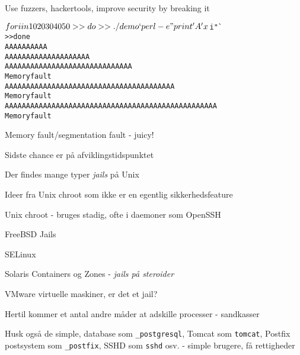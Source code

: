 \documentclass[Screen16to9,17pt]{foils}
\begin{document}



\centerline{Use fuzzers, hackertools, improve security by breaking it}



\begin{alltt}
$ for i in 10 20 30 40 50
>> do
>> ./demo `perl -e "print 'A'x$i"`
>> done
AAAAAAAAAA
AAAAAAAAAAAAAAAAAAAA
AAAAAAAAAAAAAAAAAAAAAAAAAAAAAA
Memory fault
AAAAAAAAAAAAAAAAAAAAAAAAAAAAAAAAAAAAAAAA
Memory fault
AAAAAAAAAAAAAAAAAAAAAAAAAAAAAAAAAAAAAAAAAAAAAAAAAA
Memory fault
\end{alltt}

\centerline{Memory fault/segmentation fault - juicy!}




\centerline{Sidste chance er på afviklingstidspunktet}




\begin{list1}
\item Der findes mange typer \emph{jails} på Unix
\item Ideer fra Unix chroot som ikke er en egentlig sikkerhedsfeature
\begin{list2}
\item Unix chroot - bruges stadig, ofte i daemoner som OpenSSH
\item FreeBSD Jails
\item SELinux
\item Solaris Containers og Zones - \emph{jails på steroider}
\item VMware virtuelle maskiner, er det et jail?
\end{list2}
\item Hertil kommer et antal andre måder at adskille processer - sandkasser
\item Husk også de simple, database som \verb+_postgresql+, Tomcat som \verb+tomcat+, Postfix postsystem som \verb+_postfix+, SSHD som \verb+sshd+ osv. - simple brugere, få rettigheder
\end{list1}

\end{document}
